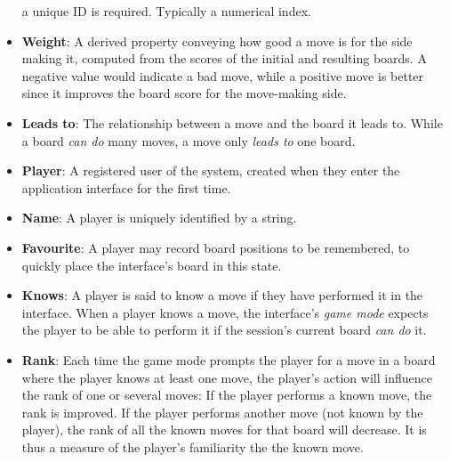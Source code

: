 \documentclass[a4paper,11pt,x11 names]{article}
\begin{document}
\begin{itemize}
        a unique ID is required. Typically a numerical index.
    \item \textbf{Weight}: A derived property conveying how good
        a move is for the side making it, computed from the scores
        of the initial and resulting boards. A negative value would indicate
        a bad move, while a positive move is better since it improves the 
        board score for the move-making side.
    \item \textbf{Leads to}: The relationship between a move and the board
        it leads to. While a board \textit{can do} many moves, a move
        only \textit{leads to} one board.
    \item \textbf{Player}: A registered user of the system, created
        when they enter the application interface for the first time.
    \item \textbf{Name}: A player is uniquely identified by a string.
    \item \textbf{Favourite}: A player may record board positions
        to be remembered, to quickly place the interface's board in this
        state.
    \item \textbf{Knows}: A player is said to know a move if they have
        performed it in the interface. When a player knows a move,
        the interface's \textit{game mode} expects the player to be able
        to perform it if the session's current board \textit{can do} it.
    \item \textbf{Rank}: Each time the game mode prompts the player for a move
        in a board where the player knows at least one move, the player's action
        will influence the rank of one or several moves:
        If the player performs a known move, the rank is improved.
        If the player performs another move (not known by the player),
        the rank of all the known moves for that board will decrease.
        It is thus a measure of the player's familiarity the the known move.
\end{itemize}
\end{document}
